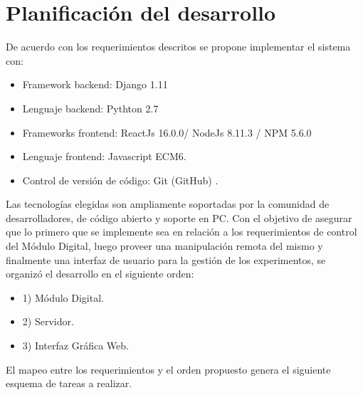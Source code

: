 \section{Planificaci\'on del desarrollo}


De acuerdo con los requerimientos descritos se propone implementar el sistema con:

\begin{itemize}
    \item Framework backend: Django 1.11
    \item Lenguaje backend: Pythton 2.7
    \item Frameworks frontend: ReactJs 16.0.0\cite{create_react_app}/ NodeJs 8.11.3 / NPM 5.6.0
    \item Lenguaje frontend: Javascript ECM6.
    \item Control de versi\'on de c\'odigo: Git (GitHub)\cite{github} .
\end{itemize}
Las tecnolog\'ias elegidas son ampliamente soportadas por la comunidad de desarrolladores, de c\'odigo abierto y soporte en PC. Con el objetivo de asegurar que lo primero que se implemente sea en relaci\'on a los requerimientos 
de control del M\'odulo Digital, luego proveer una manipulaci\'on remota del mismo y finalmente una interfaz de
usuario para la gesti\'on de los experimentos, se organiz\'o el desarrollo en el siguiente orden:
\begin{itemize}
    \item 1) M\'odulo Digital.
    \item 2) Servidor.
    \item 3) Interfaz Gr\'afica Web.
\end{itemize}
El mapeo entre los requerimientos y el orden propuesto genera el siguiente esquema de tareas a realizar.
